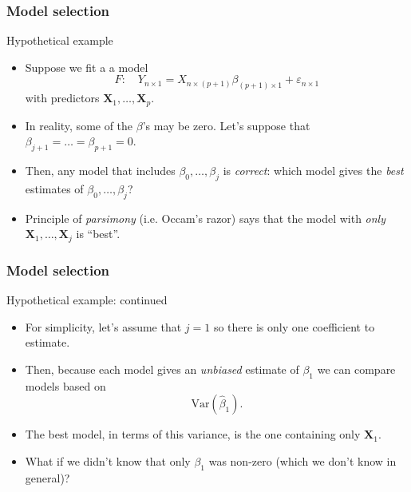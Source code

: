 \documentclass[handout]{beamer}
\begin{document}
   \begin{frame} \frametitle{Model selection}

   \begin{block}
   {Hypothetical example}
   \begin{itemize}
   \item Suppose we fit a a model
   $$
   F: \quad Y_{n \times 1} = X_{n \times (p+1)} \beta_{(p+1) \times 1} + \varepsilon_{n \times 1}$$
   with predictors ${\pmb X}_1, \dots, {\pmb X}_p$.

   \item In reality, some of the $\beta$'s may be zero. Let's suppose that
   $\beta_{j+1}= \dots= \beta_{p+1}=0$.

   \item Then, any model that includes $\beta_0, \dots, \beta_j$ is {\em correct}: which model gives the  {\em best} estimates of $\beta_0, \dots, \beta_j$?

   \item Principle of {\em parsimony} (i.e. Occam's razor) says that the model
   with {\em only} $\pmb{X}_1, \dots, \pmb{X}_j$ is ``best''.

   \end{itemize}
   \end{block}
   \end{frame}


   \begin{frame} \frametitle{Model selection}

   \begin{block}
   {Hypothetical example: continued}
   \begin{itemize}

   \item For simplicity, let's assume that $j=1$ so there is only one coefficient to estimate.

   \item Then, because each model gives an {\em unbiased} estimate
   of $\beta_1$ we can compare models based on
   $$
   \text{Var}(\widehat{\beta}_1).$$

   \item The best model, in terms of
   this variance, is the one containing only ${\pmb X}_1$.

   \item What if we didn't know that only $\beta_1$ was
   non-zero (which we don't know in general)?

   \end{itemize}
   \end{block}
   \end{frame}
\end{document}
